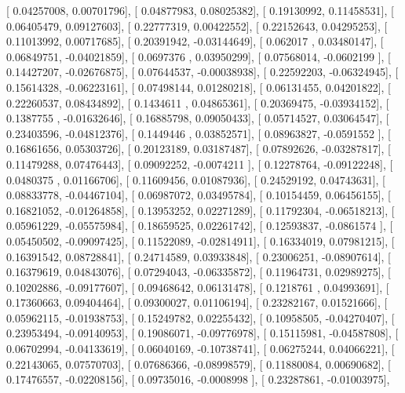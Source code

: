 \documentclass{article}
\begin{document}
       [ 0.04257008,  0.00701796],
       [ 0.04877983,  0.08025382],
       [ 0.19130992,  0.11458531],
       [ 0.06405479,  0.09127603],
       [ 0.22777319,  0.00422552],
       [ 0.22152643,  0.04295253],
       [ 0.11013992,  0.00717685],
       [ 0.20391942, -0.03144649],
       [ 0.062017  ,  0.03480147],
       [ 0.06849751, -0.04021859],
       [ 0.0697376 ,  0.03950299],
       [ 0.07568014, -0.0602199 ],
       [ 0.14427207, -0.02676875],
       [ 0.07644537, -0.00038938],
       [ 0.22592203, -0.06324945],
       [ 0.15614328, -0.06223161],
       [ 0.07498144,  0.01280218],
       [ 0.06131455,  0.04201822],
       [ 0.22260537,  0.08434892],
       [ 0.1434611 ,  0.04865361],
       [ 0.20369475, -0.03934152],
       [ 0.1387755 , -0.01632646],
       [ 0.16885798,  0.09050433],
       [ 0.05714527,  0.03064547],
       [ 0.23403596, -0.04812376],
       [ 0.1449446 ,  0.03852571],
       [ 0.08963827, -0.0591552 ],
       [ 0.16861656,  0.05303726],
       [ 0.20123189,  0.03187487],
       [ 0.07892626, -0.03287817],
       [ 0.11479288,  0.07476443],
       [ 0.09092252, -0.0074211 ],
       [ 0.12278764, -0.09122248],
       [ 0.0480375 ,  0.01166706],
       [ 0.11609456,  0.01087936],
       [ 0.24529192,  0.04743631],
       [ 0.08833778, -0.04467104],
       [ 0.06987072,  0.03495784],
       [ 0.10154459,  0.06456155],
       [ 0.16821052, -0.01264858],
       [ 0.13953252,  0.02271289],
       [ 0.11792304, -0.06518213],
       [ 0.05961229, -0.05575984],
       [ 0.18659525,  0.02261742],
       [ 0.12593837, -0.0861574 ],
       [ 0.05450502, -0.09097425],
       [ 0.11522089, -0.02814911],
       [ 0.16334019,  0.07981215],
       [ 0.16391542,  0.08728841],
       [ 0.24714589,  0.03933848],
       [ 0.23006251, -0.08907614],
       [ 0.16379619,  0.04843076],
       [ 0.07294043, -0.06335872],
       [ 0.11964731,  0.02989275],
       [ 0.10202886, -0.09177607],
       [ 0.09468642,  0.06131478],
       [ 0.1218761 ,  0.04993691],
       [ 0.17360663,  0.09404464],
       [ 0.09300027,  0.01106194],
       [ 0.23282167,  0.01521666],
       [ 0.05962115, -0.01938753],
       [ 0.15249782,  0.02255432],
       [ 0.10958505, -0.04270407],
       [ 0.23953494, -0.09140953],
       [ 0.19086071, -0.09776978],
       [ 0.15115981, -0.04587808],
       [ 0.06702994, -0.04133619],
       [ 0.06040169, -0.10738741],
       [ 0.06275244,  0.04066221],
       [ 0.22143065,  0.07570703],
       [ 0.07686366, -0.08998579],
       [ 0.11880084,  0.00690682],
       [ 0.17476557, -0.02208156],
       [ 0.09735016, -0.0008998 ],
       [ 0.23287861, -0.01003975],
\end{document}
